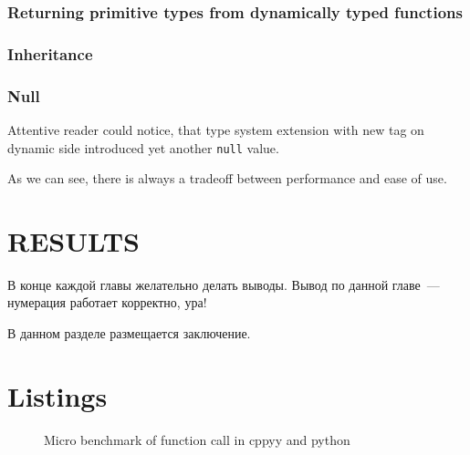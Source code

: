 \documentclass[times, %
			   specification,annotation, %
			   titlepage-extra-ru,specification-extra-ru,annotation-extra-ru, %
			   languages={russian,english} %
			  ]{itmo-student-thesis}
\begin{document}
\subsection{Returning primitive types from dynamically typed functions}
\subsection{Inheritance}
\subsection{Null}
Attentive reader could notice, that type system extension with new tag on dynamic side introduced yet another \texttt{null} value.

\chapterconclusion
As we can see, there is always a tradeoff between performance and ease of use.

\chapter{RESULTS}

\chapterconclusion

В конце каждой главы желательно делать выводы. Вывод по данной главе~--- нумерация работает корректно, ура!

\startconclusionpage

В данном разделе размещается заключение.

\printmainbibliography

\appendix

\chapter{Listings}
\begin{figure}[!h]
	\caption{Micro benchmark of function call in cppyy and python}\label{apx:cppyy-bench}
	
\end{figure}
\end{document}

